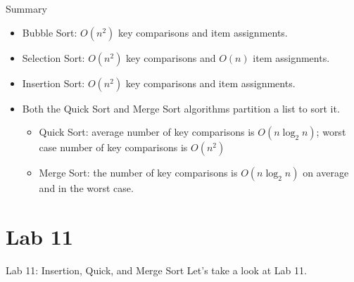 \documentclass[14pt,aspectratio=1610]{beamer}
\begin{document}
\begin{frame}{Summary}
\begin{itemize}[<+->]
\item
  Bubble Sort: \(O(n^2)\) key comparisons and item assignments.
\item
  Selection Sort: \(O(n^2)\) key comparisons and \(O(n)\) item assignments.
\item
  Insertion Sort: \(O(n^2)\) key comparisons and item assignments.
\item
  Both the Quick Sort and Merge Sort algorithms partition a list to sort it.
  \begin{itemize}
    \item
      Quick Sort: average number of key comparisons is \(O(n\log_2n)\); worst case number of key comparisons is \(O(n^2)\)
    \item
      Merge Sort: the number of key comparisons is \(O(n\log_2n)\) on average and in the worst case.
  \end{itemize}
\end{itemize}
\end{frame}

\section*{Lab 11}
\begin{frame}{Lab 11: Insertion, Quick, and Merge Sort}
\centering\Large
  Let's take a look at Lab 11.
\end{frame}
\end{document}
